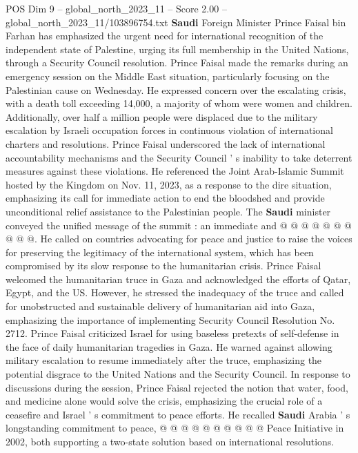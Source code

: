 \begin{textsample}{POS Dim 9 – global\_north\_2023\_11 – Score 2.00 – global\_north\_2023\_11/103896754.txt}  \label{ex:f9_pos_375}
\textbf{Saudi} Foreign Minister Prince Faisal bin Farhan has emphasized the urgent need for international recognition of the independent state of Palestine, urging its full membership in the United Nations, through a Security Council resolution.
Prince Faisal made the remarks during an emergency session on the Middle East situation, particularly focusing on the Palestinian cause on Wednesday.
He expressed concern over the escalating crisis, with a death toll exceeding 14,000, a majority of whom were women and children.
Additionally, over half a million people were displaced due to the military escalation by Israeli occupation forces in continuous violation of international charters and resolutions.
Prince Faisal underscored the lack of international accountability mechanisms and the Security Council ' s inability to take deterrent measures against these violations.
He referenced the Joint Arab-Islamic Summit hosted by the Kingdom on Nov. 11, 2023, as a response to the dire situation, emphasizing its call for immediate action to end the bloodshed and provide unconditional relief assistance to the Palestinian people.
The \textbf{Saudi} minister conveyed the unified message of the summit : an immediate and @ @ @ @ @ @ @ @ @ @.
He called on countries advocating for peace and justice to raise the voices for preserving the legitimacy of the international system, which has been compromised by its slow response to the humanitarian crisis.
Prince Faisal welcomed the humanitarian truce in Gaza and acknowledged the efforts of Qatar, Egypt, and the US.
However, he stressed the inadequacy of the truce and called for unobstructed and sustainable delivery of humanitarian aid into Gaza, emphasizing the importance of implementing Security Council Resolution No. 2712.
Prince Faisal criticized Israel for using baseless pretexts of self-defense in the face of daily humanitarian tragedies in Gaza.
He warned against allowing military escalation to resume immediately after the truce, emphasizing the potential disgrace to the United Nations and the Security Council.
In response to discussions during the session, Prince Faisal rejected the notion that water, food, and medicine alone would solve the crisis, emphasizing the crucial role of a ceasefire and Israel ' s commitment to peace efforts.
He recalled \textbf{Saudi} Arabia ' s longstanding commitment to peace, @ @ @ @ @ @ @ @ @ @ Peace Initiative in 2002, both supporting a two-state solution based on international resolutions.

\end{textsample}
